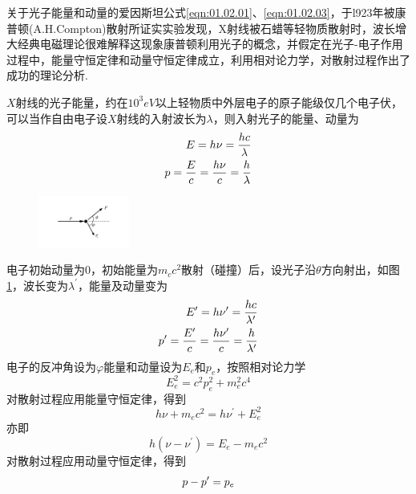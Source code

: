关于光子能量和动量的爱因斯坦公式\eqref{eqn:01.02.01}、\eqref{eqn:01.02.03}，于l923年被康普顿(A.H.Compton)散射所证实实验发现，X射线被石蜡等轻物质散射时，波长增大经典电磁理论很难解释这现象康普顿利用光子的概念，并假定在光子-电子作用过程中，能量守恒定律和动量守恒定律成立，利用相对论力学，对散射过程作出了成功的理论分析.

$X$射线的光子能量，约在$10^{3}\si{eV}$以上轻物质中外层电子的原子能级仅几个电子伏，可以当作自由电子设$X$射线的入射波长为$\lambda$，则入射光子的能量、动量为
\begin{equation} 
	\begin{aligned} \notag
		E=h\nu=\frac{hc}{\lambda} \\
		p=\frac{E}{c}=\frac{h\nu}{c}=\frac{h}{\lambda}
	\end{aligned}
\end{equation}
\begin{figure}
	\centering
	\includegraphics[width=3cm]{QM file/figure/1-3}
	\caption{}
	\label{fig.1-3}
\end{figure}
电子初始动量为0，初始能量为$m_{c}c^{2}$散射（碰撞）后，设光子沿$\theta$方向射出，如图\ref{fig.1-3}，波长变为$\lambda^{\prime}$，能量及动量变为
\setlength{\mathindent}{6em}
\begin{equation}
	\begin{aligned} \notag
		E^{\prime}=h\nu^{\prime}=\frac{hc}{\lambda^{\prime}} \\
		p^{\prime}=\frac{E^{\prime}}{c}=\frac{h\nu^{\prime}}{c}=\frac{h}{\lambda^{\prime}}
	\end{aligned}
\end{equation}
\eqnormal
电子的反冲角设为$\varphi$能量和动量设为$E_{e}$和$p_{e}$，按照相对论力学
\begin{equation}\label{eqn:01.02.05}
	E_{e}^2=c^{2}p_{e}^{2}+m_{e}^{2}c^{4}
\end{equation}
对散射过程应用能量守恒定律，得到
\begin{equation*}
	h\nu+m_{e}c^{2}=h\nu^{\prime}+E_{e}^{2}
\end{equation*}
亦即
\begin{equation}\label{eqn:01.02.06}
	h(\nu-\nu^{\prime})=E_{e}-m_{e}c^{2}
\end{equation}
对散射过程应用动量守恒定律，得到
\begin{equation}\label{eqn:01.02.07}
	\boldmath p-p^{\prime}=p_{e}
\end{equation}
